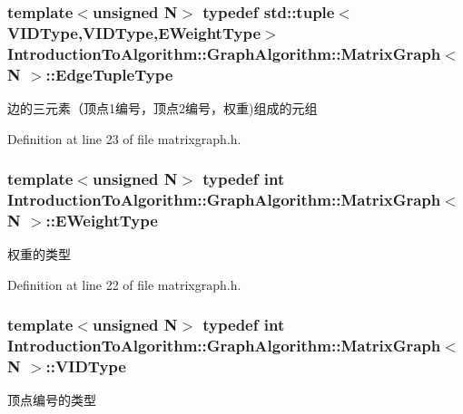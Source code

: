 \subsubsection[{Edge\+Tuple\+Type}]{\setlength{\rightskip}{0pt plus 5cm}template$<$unsigned N$>$ typedef std\+::tuple$<${\bf V\+I\+D\+Type},{\bf V\+I\+D\+Type},{\bf E\+Weight\+Type}$>$ {\bf Introduction\+To\+Algorithm\+::\+Graph\+Algorithm\+::\+Matrix\+Graph}$<$ N $>$\+::{\bf Edge\+Tuple\+Type}}\label{struct_introduction_to_algorithm_1_1_graph_algorithm_1_1_matrix_graph_ad698e07bacdb3f332c4f5d34bdb49463}
边的三元素（顶点1编号，顶点2编号，权重)组成的元组 

Definition at line 23 of file matrixgraph.\+h.

\hypertarget{struct_introduction_to_algorithm_1_1_graph_algorithm_1_1_matrix_graph_af54dbf6d171b89b81b490de13f1fb02f}{}
\subsubsection[{E\+Weight\+Type}]{\setlength{\rightskip}{0pt plus 5cm}template$<$unsigned N$>$ typedef int {\bf Introduction\+To\+Algorithm\+::\+Graph\+Algorithm\+::\+Matrix\+Graph}$<$ N $>$\+::{\bf E\+Weight\+Type}}\label{struct_introduction_to_algorithm_1_1_graph_algorithm_1_1_matrix_graph_af54dbf6d171b89b81b490de13f1fb02f}
权重的类型 

Definition at line 22 of file matrixgraph.\+h.

\hypertarget{struct_introduction_to_algorithm_1_1_graph_algorithm_1_1_matrix_graph_ae97378c88e8d65a880334f31a352e71d}{}
\subsubsection[{V\+I\+D\+Type}]{\setlength{\rightskip}{0pt plus 5cm}template$<$unsigned N$>$ typedef int {\bf Introduction\+To\+Algorithm\+::\+Graph\+Algorithm\+::\+Matrix\+Graph}$<$ N $>$\+::{\bf V\+I\+D\+Type}}\label{struct_introduction_to_algorithm_1_1_graph_algorithm_1_1_matrix_graph_ae97378c88e8d65a880334f31a352e71d}
顶点编号的类型 

